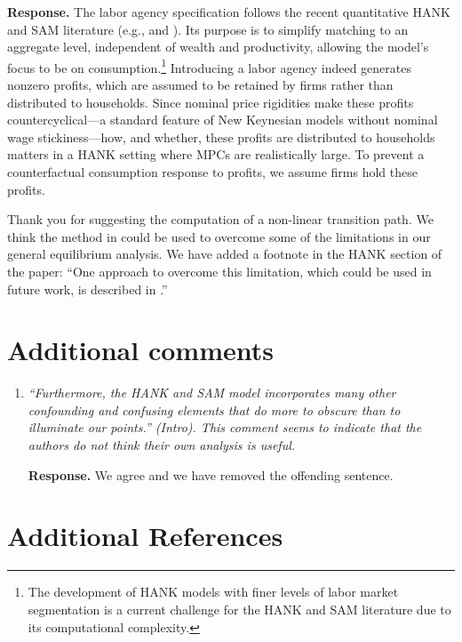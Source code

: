 \documentclass[12pt,letterpaper,english]{article}
\begin{document}
\begin{enumerate}[label=(\alph*)]
	\noindent \textbf{Response.} The labor agency specification follows the recent quantitative HANK and SAM literature (e.g., \cite{Graves2024} and \cite{Gornemann2021}). Its purpose is to simplify matching to an aggregate level, independent of wealth and productivity, allowing the model's focus to be on consumption.\footnote{The development of HANK models with finer levels of labor market segmentation is a current challenge for the HANK and SAM literature due to its computational complexity.} Introducing a labor agency indeed generates nonzero profits, which are assumed to be retained by firms rather than distributed to households. Since nominal price rigidities make these profits countercyclical—a standard feature of New Keynesian models without nominal wage stickiness—how, and whether, these profits are distributed to households matters in a HANK setting where MPCs are realistically large. To prevent a counterfactual consumption response to profits, we assume firms hold these profits.
		
	Thank you for suggesting the computation of a non-linear transition path. We think the method in \citet{boppart2018exploiting} could be used to overcome some of the limitations in our general equilibrium analysis. We have added a footnote in the HANK section of the paper: ``One approach to overcome this limitation, which could be used in future work, is described in \cite{boppart2018exploiting}.''
\end{enumerate}

\bigskip
\newpage

\section*{Additional comments}

	\begin{enumerate}[label=(\alph*)]
		\item \textit{``Furthermore, the HANK and SAM model incorporates many other confounding and confusing elements that do more to obscure than to illuminate our points.'' (Intro). This comment seems to indicate that the authors do not think their own analysis is useful.}
		
		\noindent \textbf{Response.} We agree and we have removed the offending sentence.
	\end{enumerate}

\bigskip

\section*{Additional References}
	
\end{document}
